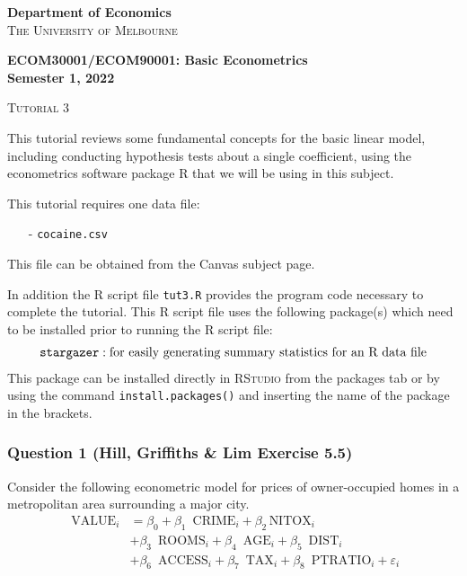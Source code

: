 \documentclass[12pt,a4paper]{article}
\begin{document}
\thispagestyle{plain}
\begin{center}
\textbf{Department of Economics} \\
\textsc{The University of Melbourne}
\end{center}
\vspace{0.1in}
\begin{center}
\textbf{ECOM30001/ECOM90001: Basic Econometrics} \\
\textbf{Semester 1, 2022}
\end{center}
\vspace{0.1in}
\begin{center}
\textsc{Tutorial 3}
\end{center}
\noindent \hrulefill

\noindent This tutorial reviews some fundamental concepts for the basic linear model, including conducting hypothesis tests about a single coefficient, using the econometrics
software package \textsc{R} that we will be using in this
subject. \vspace{0.1in}

\noindent This tutorial requires one data file:
\begin{itemize}
\item[-] \texttt{cocaine.csv}
\end{itemize}
This file can be obtained from the Canvas subject page.  \vspace{0.1in}

\noindent In addition the R script file \texttt{tut3.R} provides the program code necessary to complete the tutorial. This R script file uses the following package(s) which need to be installed prior to running the R script file:
\begin{align*}
\mbox{\texttt{stargazer}} & : \mbox{for easily generating summary statistics for an R data file} \\
\end{align*}
This package can be installed directly in \textsc{RStudio} from the packages tab or by using the command \texttt{install.packages()} and inserting the name of the package in the brackets.

 \newpage
\subsubsection*{Question 1 (Hill, Griffiths \& Lim Exercise 5.5)}
\renewcommand{\labelenumi}{\alph{enumi})}

Consider the following econometric model for prices of owner-occupied homes in a metropolitan area surrounding a major city.
\begin{align*}
\mbox{ VALUE}_{i} & = \beta_{0} + \beta_{1}\,\mbox{ CRIME}_{i} +
\beta_{2}\,\mbox{
NITOX}_{i} \\
 &+ \beta_{3}\,\mbox{ ROOMS}_{i} + \beta_{4}\,\mbox{ AGE}_{i} + \beta_{5}\,\mbox{ DIST}_{i}
 \\
 & + \beta_{6}\,\mbox{ ACCESS}_{i} + \beta_{7}\,\mbox{ TAX}_{i}
+ \beta_{8}\,\mbox{ PTRATIO}_{i} + \varepsilon_{i}
\end{align*}
\end{document}
